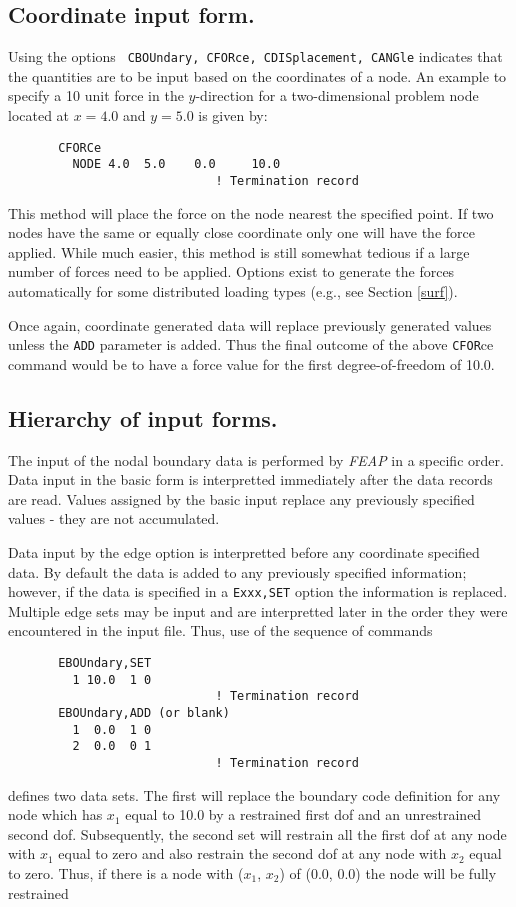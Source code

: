 \subsection{Coordinate input form.}

Using the options {\tt
CBOUndary, CFORce, CDISplacement, CANGle} indicates that the quantities
are to be input based on the coordinates of a node.
An example to specify a 10 unit force in the $y$-direction for a two-dimensional
problem node located at $x = 4.0$ and $y = 5.0$ is given by:
\begin{verbatim}
       CFORCe
         NODE 4.0  5.0    0.0     10.0
                             ! Termination record
\end{verbatim}
This method will place the force on the node nearest the specified point.
If two nodes have the same or equally close
coordinate only one will have the force applied.
While much easier, this method is still somewhat tedious if a large number of
forces need to be applied.  Options exist to generate the forces automatically
for some distributed loading types (e.g., see Section \ref{surf}).

Once again, coordinate generated data will replace previously generated values
unless the {\tt ADD} parameter is added.  Thus the final outcome of the above
{\tt CFOR}ce command would be to have a force value
for the first degree-of-freedom of 10.0.

\subsection{Hierarchy of input forms.}

The input of the nodal boundary data is performed by {\sl FEAP} in a specific
order.  Data input in the basic form is interpretted immediately after the
data records are read.  Values assigned by the basic input replace any
previously specified values - they are not accumulated.

Data input by the edge option is interpretted before any coordinate specified
data.  By default the data is added to any previously specified information;
however, if the data is specified in a {\tt Exxx,SET} option the information is
replaced.  Multiple edge sets may be input and are interpretted later in
the order they were encountered in the input file.  Thus, use of the sequence
of commands
\begin{verbatim}
       EBOUndary,SET
         1 10.0  1 0
                             ! Termination record
       EBOUndary,ADD (or blank)
         1  0.0  1 0
         2  0.0  0 1
                             ! Termination record
\end{verbatim}
defines two data sets.  The first will replace the boundary code definition
for any node which has $x_1$ equal to 10.0 by a restrained first dof and
an unrestrained second dof.  Subsequently, the second set will restrain
all the first dof at any node with $x_1$ equal to zero
and also restrain the second dof at any node with $x_2$ equal to zero. 
Thus, if there is a node with ($x_1$, $x_2$) of (0.0, 0.0) the node will
be fully restrained

